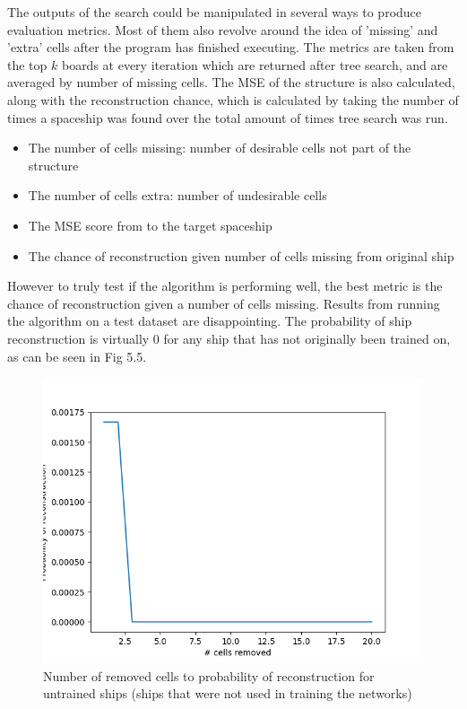 \documentclass{l4proj}
\begin{document}

The outputs of the search could be manipulated in several ways to produce evaluation metrics. Most of them also revolve around the idea of 'missing' and 'extra' cells after the program has finished executing. The metrics are taken from the top $k$ boards at every iteration which are returned after tree search, and are averaged by number of missing cells. The MSE of the structure is also calculated, along with the reconstruction chance, which is calculated by taking the number of times a spaceship was found over the total amount of times tree search was run.


\begin{itemize}
    \item The number of cells missing: number of desirable cells not part of the structure
    \item The number of cells extra: number of undesirable cells
    \item The MSE score from to the target spaceship
    \item The chance of reconstruction given number of cells missing from original ship
\end{itemize}

However to truly test if the algorithm is performing well, the best metric is the chance of reconstruction given a number of cells missing. Results from running the algorithm on a test dataset are disappointing. The probability of ship reconstruction is virtually 0 for any ship that has not originally been trained on, as can be seen in Fig 5.5.

\begin{figure}[h!]
\centering
\includegraphics[width=0.8\linewidth]{dissertation/images/graphs/probability_of_reconstruction_against_damage_testin_only.png}
\caption{Number of removed cells to probability of reconstruction for untrained ships (ships that were not used in training the networks)}
\label{fig:subim1}
\end{figure}
\end{document}
